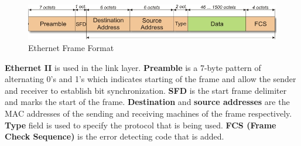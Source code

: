 \documentclass[a4paper,10pt]{article}
\newlength{\strutheight}
\begin{document}
\begin{enumerate}
\begin{adjustbox}{valign=T,raise=\strutheight,minipage={\linewidth}}
		\begin{figure}
			\includegraphics[width=12cm]{Images/ethernet_frame}
			\caption{Ethernet Frame Format}
		\end{figure}
		\strut{}
		\textbf{Ethernet II} is used in the link layer. \textbf{Preamble} is a 7-byte pattern of alternating 0's and 1's which indicates starting of the frame and allow the sender and receiver to establish bit synchronization. \textbf{SFD} is the start frame delimiter and marks the start of the frame. \textbf{Destination} and \textbf{source addresses} are the MAC addresses of the sending and receiving machines of the frame respectively. \textbf{Type} field is used to specify the protocol that is being used. \textbf{FCS (Frame Check Sequence)} is the error detecting code that is added. 
	\end{adjustbox} 
\end{enumerate}
\end{document}
